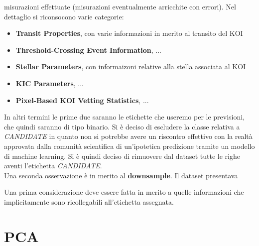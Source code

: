 misurazioni effettuate (misurazioni eventualmente arricchite con errori). Nel 
dettaglio si riconsocono varie categorie:
\begin{itemize}
    \item \textbf{Transit Properties}, con varie informazioni in merito al 
    transito del KOI
    \item \textbf{Threshold-Crossing Event Information}, ...
    \item \textbf{Stellar Parameters}, con informaizoni relative alla stella
    associata al KOI
    \item \textbf{KIC Parameters}, ...
    \item \textbf{Pixel-Based KOI Vetting Statistics}, ...
\end{itemize}














In altri termini le prime due saranno le etichette che useremo per le 
previsioni, che quindi saranno di tipo binario. Si è deciso di escludere la 
classe relativa a \textit{CANDIDATE} in quanto non si potrebbe avere un 
riscontro effettivo con la realtà approvata dalla comunità scientifica di 
un'ipotetica predizione tramite un modello di machine learning. Si è quindi
deciso di rimuovere dal dataset tutte le righe aventi l'etichetta 
\textit{CANDIDATE}.\\
Una seconda osservazione è in merito al \textbf{downsample}. Il dataset 
presentava 


Una prima considerazione deve essere fatta in merito a quelle informazioni che
implicitamente sono ricollegabili all'etichetta assegnata.





\section{PCA}